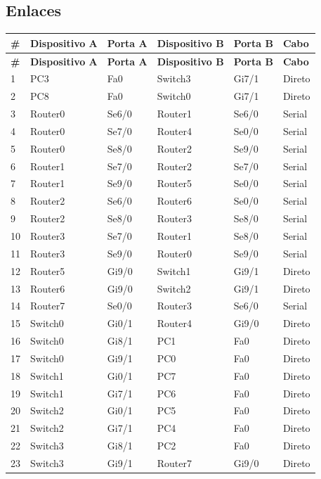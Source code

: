 \subsection{Enlaces}
\begingroup\scriptsize\setlength{\tabcolsep}{3pt}
\begin{longtable}{@{}p{}p{}p{}p{}p{}p{}@{}}
\toprule \textbf{\#} & \textbf{Dispositivo A} & \textbf{Porta A} & \textbf{Dispositivo B} & \textbf{Porta B} & \textbf{Cabo} \\\midrule\endfirsthead
\toprule \textbf{\#} & \textbf{Dispositivo A} & \textbf{Porta A} & \textbf{Dispositivo B} & \textbf{Porta B} & \textbf{Cabo} \\\midrule\endhead
1 & PC3 & Fa0 & Switch3 & Gi7/1 & Direto \\
2 & PC8 & Fa0 & Switch0 & Gi7/1 & Direto \\
3 & Router0 & Se6/0 & Router1 & Se6/0 & Serial \\
4 & Router0 & Se7/0 & Router4 & Se0/0 & Serial \\
5 & Router0 & Se8/0 & Router2 & Se9/0 & Serial \\
6 & Router1 & Se7/0 & Router2 & Se7/0 & Serial \\
7 & Router1 & Se9/0 & Router5 & Se0/0 & Serial \\
8 & Router2 & Se6/0 & Router6 & Se0/0 & Serial \\
9 & Router2 & Se8/0 & Router3 & Se8/0 & Serial \\
10 & Router3 & Se7/0 & Router1 & Se8/0 & Serial \\
11 & Router3 & Se9/0 & Router0 & Se9/0 & Serial \\
12 & Router5 & Gi9/0 & Switch1 & Gi9/1 & Direto \\
13 & Router6 & Gi9/0 & Switch2 & Gi9/1 & Direto \\
14 & Router7 & Se0/0 & Router3 & Se6/0 & Serial \\
15 & Switch0 & Gi0/1 & Router4 & Gi9/0 & Direto \\
16 & Switch0 & Gi8/1 & PC1 & Fa0 & Direto \\
17 & Switch0 & Gi9/1 & PC0 & Fa0 & Direto \\
18 & Switch1 & Gi0/1 & PC7 & Fa0 & Direto \\
19 & Switch1 & Gi7/1 & PC6 & Fa0 & Direto \\
20 & Switch2 & Gi0/1 & PC5 & Fa0 & Direto \\
21 & Switch2 & Gi7/1 & PC4 & Fa0 & Direto \\
22 & Switch3 & Gi8/1 & PC2 & Fa0 & Direto \\
23 & Switch3 & Gi9/1 & Router7 & Gi9/0 & Direto \\
\bottomrule
\end{longtable}\endgroup

